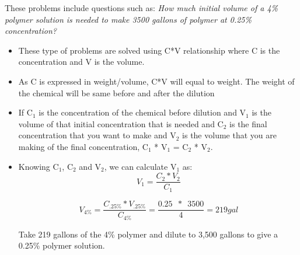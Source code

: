 These problems include questions such as:  \textit{How much initial volume of a 4\% polymer solution is needed to make 3500 gallons of polymer at 0.25\% concentration?}\\
\begin{itemize}
\item These type of problems are solved using C*V relationship where C is the concentration and V is the volume.

\item As C is expressed in weight/volume, C*V will equal to weight.  The weight of the chemical will be same before and after the dilution

\item If C$_1$ is the concentration of the chemical before dilution and V$_1$ is the volume of that initial concentration that is needed and C$_2$ is the final concentration that you want to make and V$_2$ is the volume that you are making of the final concentration, C$_1$ * V$_1$ = C$_2$ * V$_2$.

\item Knowing C$_1$, C$_2$ and V$_2$, we can calculate V$_1$ as: $$V_1 = \dfrac{C_2 * V_2}{C_1}$$

$$V_{4\%} = \dfrac{C_{.25\%} * V_{.25\%}}{C_{4\%}} = \dfrac{0.25 \enspace * \enspace 3500}{4}= 219 gal $$ 

Take 219 gallons of the 4\% polymer and dilute to 3,500 gallons to give a 0.25\% polymer solution.

\end{itemize}